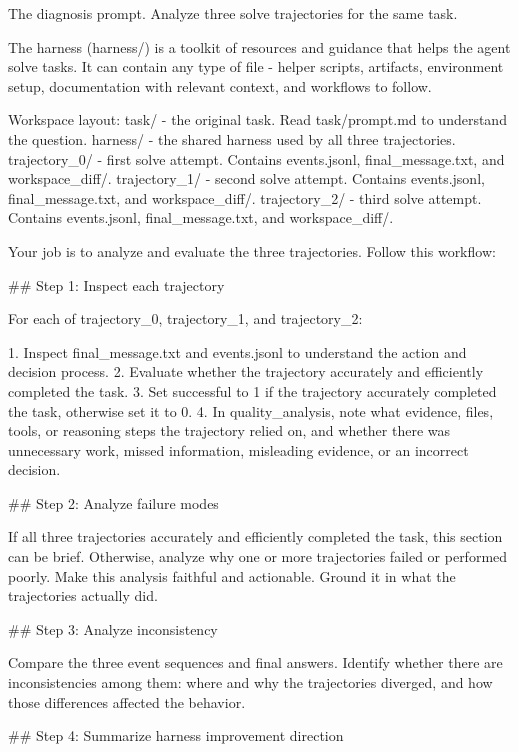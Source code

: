 \documentclass{llmxive}
\begin{document}
\begin{promptbox}{The diagnosis prompt.}
Analyze three solve trajectories for the same task.

The harness (harness/) is a toolkit of resources and guidance that helps the agent solve tasks. It can contain any type of file - helper scripts, artifacts, environment setup, documentation with relevant context, and workflows to follow.

Workspace layout:
  task/              - the original task. Read task/prompt.md to understand the question.
  harness/           - the shared harness used by all three trajectories.
  trajectory_0/      - first solve attempt. Contains events.jsonl, final_message.txt, and workspace_diff/.
  trajectory_1/      - second solve attempt. Contains events.jsonl, final_message.txt, and workspace_diff/.
  trajectory_2/      - third solve attempt. Contains events.jsonl, final_message.txt, and workspace_diff/.

Your job is to analyze and evaluate the three trajectories. Follow this workflow:

## Step 1: Inspect each trajectory

For each of trajectory_0, trajectory_1, and trajectory_2:

1. Inspect final_message.txt and events.jsonl to understand the action and decision process.
2. Evaluate whether the trajectory accurately and efficiently completed the task.
3. Set successful to 1 if the trajectory accurately completed the task, otherwise set it to 0.
4. In quality_analysis, note what evidence, files, tools, or reasoning steps the trajectory relied on, and whether there was unnecessary work, missed information, misleading evidence, or an incorrect decision.

## Step 2: Analyze failure modes

If all three trajectories accurately and efficiently completed the task, this section can be brief. Otherwise, analyze why one or more trajectories failed or performed poorly. Make this analysis faithful and actionable. Ground it in what the trajectories actually did.

## Step 3: Analyze inconsistency

Compare the three event sequences and final answers. Identify whether there are inconsistencies among them: where and why the trajectories diverged, and how those differences affected the behavior.

## Step 4: Summarize harness improvement direction


\end{promptbox}
\end{document}

